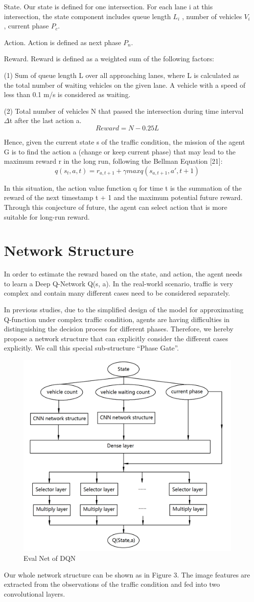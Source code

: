 \documentclass{article}
\begin{document}
 State. Our state is defined for one intersection. For each lane
i at this intersection, the state component includes queue
length $L_i$ , number of vehicles $V_i$ , current phase $P_c$.

Action. Action is defined as next phase $P_n$.

Reward. Reward is defined as a
weighted sum of the following factors:

(1) Sum of queue length L over all approaching lanes, where
L is calculated as the total number of waiting vehicles on
the given lane. A vehicle with a speed of less than 0.1 m/s
is considered as waiting.

(2) Total number of vehicles N that passed the intersection
during time interval $\Delta$t after the last action a.
$$Reward = N - 0.25 L$$

Hence, given the current state s of the traffic condition, the mission
of the agent G is to find the action a (change or keep current phase)
that may lead to the maximum reward r in the long run, following
the Bellman Equation [21]:
$$q(s_t , a, t) = r_{a,t + 1} + \gamma max q(s_{a,t +1} , a' , t + 1)$$

In this situation, the action
value function q for time t is the summation of the reward of the
next timestamp t + 1 and the maximum potential future reward.
Through this conjecture of future, the agent can select action that
is more suitable for long-run reward.

\section{Network Structure}
\quad In order to estimate the reward based on the state, and action, the
agent needs to learn a Deep Q-Network Q(s, a).
In the real-world scenario, traffic is very complex and contain
many different cases need to be considered separately.

In previous studies, due to the simplified design of the model for
approximating Q-function under complex traffic condition, agents
are having difficulties in distinguishing the decision process for
different phases. Therefore, we hereby propose a network structure
that can explicitly consider the different cases explicitly. We call
this special sub-structure “Phase Gate”.

\begin{figure}[H]
\centering
\includegraphics[width=.4\textwidth]{2d.png}
\caption{Eval Net of DQN}
\end{figure}
Our whole network structure can be shown as in Figure 3. The
image features are extracted from the observations of the traffic
condition and fed into two convolutional layers.
\end{document}
